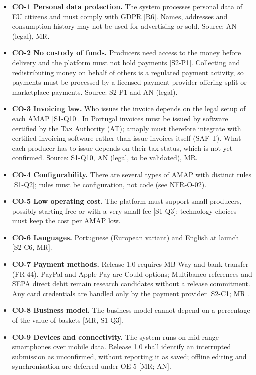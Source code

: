 \documentclass[11pt,a4paper]{article}
\begin{document}
\begin{itemize}
  \item \textbf{CO-1 Personal data protection.} The system processes personal data of EU citizens and must comply with GDPR [R6]. Names, addresses and consumption history may not be used for advertising or sold. Source: AN (legal), MR.
  \item \textbf{CO-2 No custody of funds.} Producers need access to the money before delivery and the platform must not hold payments [S2-P1]. Collecting and redistributing money on behalf of others is a regulated payment activity, so payments must be processed by a licensed payment provider offering split or marketplace payments. Source: S2-P1 and AN (legal).
  \item \textbf{CO-3 Invoicing law.} Who issues the invoice depends on the legal setup of each AMAP [S1-Q10]. In Portugal invoices must be issued by software certified by the Tax Authority (AT); amaply must therefore integrate with certified invoicing software rather than issue invoices itself (SAF-T). What each producer has to issue depends on their tax status, which is not yet confirmed. Source: S1-Q10, AN (legal, to be validated), MR.
  \item \textbf{CO-4 Configurability.} There are several types of AMAP with distinct rules [S1-Q2]; rules must be configuration, not code (see NFR-O-02).
  \item \textbf{CO-5 Low operating cost.} The platform must support small producers, possibly starting free or with a very small fee [S1-Q3]; technology choices must keep the cost per AMAP low.
  \item \textbf{CO-6 Languages.} Portuguese (European variant) and English at launch [S2-C6, MR].
  \item \textbf{CO-7 Payment methods.} Release 1.0 requires MB Way and bank transfer (FR-44). PayPal and Apple Pay are Could options; Multibanco references and SEPA direct debit remain research candidates without a release commitment. Any card credentials are handled only by the payment provider [S2-C1; MR].
  \item \textbf{CO-8 Business model.} The business model cannot depend on a percentage of the value of baskets [MR, S1-Q3].
  \item \textbf{CO-9 Devices and connectivity.} The system runs on mid-range smartphones over mobile data. Release 1.0 shall identify an interrupted submission as unconfirmed, without reporting it as saved; offline editing and synchronisation are deferred under OE-5 [MR; AN].
\end{itemize}
\end{document}
